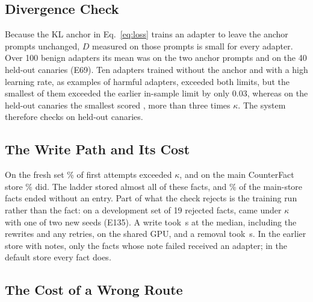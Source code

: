 \documentclass[journal,10pt]{IEEEtran}
\begin{document}
\subsection{Divergence Check}
\label{sec:check}
Because the KL anchor in Eq.~\eqref{eq:loss} trains an adapter to leave the anchor prompts unchanged, $D$
measured on those prompts is small for every adapter. Over 100 benign adapters its mean was
 on the two anchor prompts and  on
the 40 held-out canaries (E69). Ten adapters trained without the anchor and with a high learning rate, as
examples of harmful adapters, exceeded both limits, but the smallest of them exceeded the earlier in-sample limit
by only 0.03, whereas on the held-out canaries the smallest scored , more than
three times $\kappa$. The system therefore checks on held-out canaries.

\subsection{The Write Path and Its Cost}
\label{sec:write}
On the fresh set \% of first attempts exceeded $\kappa$, and
on the main CounterFact store \% did. The ladder stored
almost all of these facts, and \% of the main-store facts ended
without an entry. Part of what the check rejects is the training run rather than the fact: on a development set
of 19 rejected facts,  came under $\kappa$ with one of two new seeds
(E135). A write took \,s at the median, including the
rewrites and any retries, on the shared GPU, and a removal took \,s.
In the earlier store with notes, only the facts whose note failed received an adapter; in the default store
every fact does.

\subsection{The Cost of a Wrong Route}
\label{sec:wrong}
\end{document}
